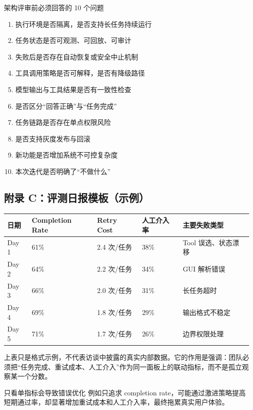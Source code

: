 \documentclass[a4paper]{article}
\begin{document}
\begin{importantbox}{架构评审前必须回答的 10 个问题}
\begin{enumerate}
    \item 执行环境是否隔离，是否支持长任务持续运行
    \item 任务状态是否可观测、可回放、可审计
    \item 失败后是否存在自动恢复或安全中止机制
    \item 工具调用策略是否可解释，是否有降级路径
    \item 模型输出与工具结果是否有一致性检查
    \item 是否区分“回答正确”与“任务完成”
    \item 任务链路是否存在单点权限风险
    \item 是否支持灰度发布与回滚
    \item 新功能是否增加系统不可控复杂度
    \item 本次迭代是否明确了“不做什么”
\end{enumerate}
\end{importantbox}

\subsection{附录 C：评测日报模板（示例）}

\begin{center}
\begin{tabular}{p{2.8cm}p{2.5cm}p{2.5cm}p{2.8cm}p{3.5cm}}
\toprule
日期 & Completion Rate & Retry Cost & 人工介入率 & 主要失败类型 \\
\midrule
Day 1 & 61\% & 2.4 次/任务 & 38\% & Tool 误选、状态漂移 \\
Day 2 & 64\% & 2.2 次/任务 & 34\% & GUI 解析错误 \\
Day 3 & 66\% & 2.0 次/任务 & 31\% & 长任务超时 \\
Day 4 & 69\% & 1.8 次/任务 & 29\% & 输出格式不稳定 \\
Day 5 & 71\% & 1.7 次/任务 & 26\% & 边界权限处理 \\
\bottomrule
\end{tabular}
\end{center}

上表只是格式示例，不代表访谈中披露的真实内部数据。它的作用是强调：团队必须把“任务完成、重试成本、人工介入”作为同一面板上的联动指标，而不是孤立观察某一个分数。

\begin{warningbox}{只看单指标会导致错误优化}
例如只追求 completion rate，可能通过激进策略提高短期通过率，却显著增加重试成本和人工介入率，最终拖累真实用户体验。
\end{warningbox}
\end{document}
